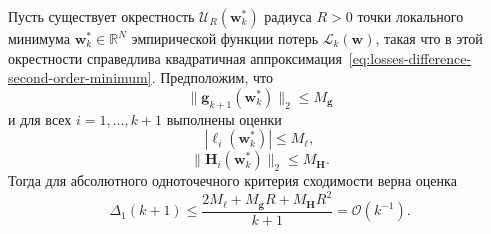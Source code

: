 \begin{theorem}
    \label{thm:abs-onepoint-general}
    Пусть существует окрестность $\mathcal U_R(\mathbf w_k^*)$ радиуса $R>0$
    точки локального минимума $\mathbf w_k^* \in \mathbb R^N$ эмпирической
    функции потерь $\mathcal L_k(\mathbf w)$, такая что в этой окрестности
    справедлива квадратичная аппроксимация~\eqref{eq:losses-difference-second-order-minimum}.
    Предположим, что
    \begin{equation}
        \label{eq:abs-onepoint-thm-ass-grad}
        \|\mathbf g_{k+1}(\mathbf w_k^*)\|_2 \leqslant M_{\mathbf g}
    \end{equation}
    и для всех $i=1, \ldots, k+1$ выполнены оценки
    \begin{equation}
        \label{eq:abs-onepoint-thm-ass-loss}
        |\ell_i(\mathbf w_k^*)| \leqslant M_\ell,
    \end{equation}
    \begin{equation}
        \label{eq:abs-onepoint-thm-ass-hess}
        \|\mathbf H_i(\mathbf w_k^*)\|_2 \leqslant M_{\mathbf H}.
    \end{equation}
    Тогда для абсолютного одноточечного критерия сходимости верна оценка
    \begin{equation}
        \label{eq:abs-onepoint-general-theorem}
        \Delta_1(k+1)
        \leqslant
        \frac{2M_\ell + M_{\mathbf g}R + M_{\mathbf H}R^2}{k+1}
        = \mathcal{O}(k^{-1}).
    \end{equation}
\end{theorem}

